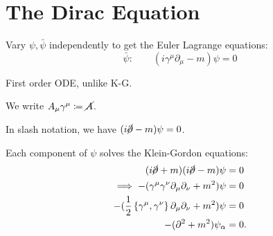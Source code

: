 \section{The Dirac Equation}%
\label{sec:the_dirac_equation}

Vary $\psi, \bar \psi$ independently to get the Euler Lagrange equations:
\begin{equation}
  \bar \psi \colon \qquad (i\gamma^{\mu} \partial_{\mu} - m) \psi = 0
\end{equation}
\begin{leftbar}
  \begin{remark}
    First order ODE, unlike K-G.
  \end{remark}
\end{leftbar}
\begin{definition}
  We write $A_{\mu} \gamma^{\mu} \coloneqq \cancel{A}$.
\end{definition}
In slash notation, we have $(i \cancel{\partial} - m) \psi = 0$.

Each component of $\psi$ solves the Klein-Gordon equations:
\begin{align}
  (i \cancel{\partial} + m)(i \cancel{\partial} - m) \psi &= 0 \\
  \implies -(\gamma^{\mu} \gamma^{\nu} \partial_{\mu} \partial_{\nu} + m^2) \psi &= 0 \\
  - (\frac{1}{2} \left\{ \gamma^{\mu}, \gamma^{\nu} \right\} \partial_{\mu} \partial_{\nu} + m^2) \psi &= 0\\
  - (\partial^2 + m^2) \psi_{\alpha} &= 0.
\end{align}
